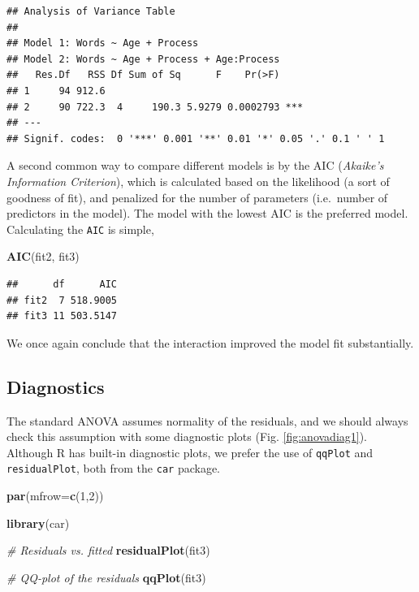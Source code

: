 \documentclass[]{book}
\newenvironment{Shaded}{\begin{snugshade}}{\end{snugshade}}
\newcommand{\CommentTok}[1]{\textcolor[rgb]{0.56,0.35,0.01}{\textit{#1}}}
\newcommand{\DataTypeTok}[1]{\textcolor[rgb]{0.13,0.29,0.53}{#1}}
\newcommand{\DecValTok}[1]{\textcolor[rgb]{0.00,0.00,0.81}{#1}}
\newcommand{\KeywordTok}[1]{\textcolor[rgb]{0.13,0.29,0.53}{\textbf{#1}}}
\newcommand{\NormalTok}[1]{#1}
\begin{document}
\begin{verbatim}
## Analysis of Variance Table
## 
## Model 1: Words ~ Age + Process
## Model 2: Words ~ Age + Process + Age:Process
##   Res.Df   RSS Df Sum of Sq      F    Pr(>F)    
## 1     94 912.6                                  
## 2     90 722.3  4     190.3 5.9279 0.0002793 ***
## ---
## Signif. codes:  0 '***' 0.001 '**' 0.01 '*' 0.05 '.' 0.1 ' ' 1
\end{verbatim}

A second common way to compare different models is by the AIC (\emph{Akaike's Information Criterion}), which is calculated based on the likelihood (a sort of goodness of fit), and penalized for the number of parameters (i.e.~number of predictors in the model). The model with the lowest AIC is the preferred model. Calculating the \texttt{AIC} is simple,

\begin{Shaded}
\begin{Highlighting}[]
\KeywordTok{AIC}\NormalTok{(fit2, fit3)}
\end{Highlighting}
\end{Shaded}

\begin{verbatim}
##      df      AIC
## fit2  7 518.9005
## fit3 11 503.5147
\end{verbatim}

We once again conclude that the interaction improved the model fit substantially.

\hypertarget{diagnostics}{%
\subsection{Diagnostics}\label{diagnostics}}

The standard ANOVA assumes normality of the residuals, and we should always check this assumption with some diagnostic plots (Fig. \ref{fig:anovadiag1}). Although R has built-in diagnostic plots, we prefer the use of \texttt{qqPlot} and \texttt{residualPlot}, both from the \texttt{car} package.

\begin{Shaded}
\begin{Highlighting}[]
\KeywordTok{par}\NormalTok{(}\DataTypeTok{mfrow=}\KeywordTok{c}\NormalTok{(}\DecValTok{1}\NormalTok{,}\DecValTok{2}\NormalTok{))}

\KeywordTok{library}\NormalTok{(car)}

\CommentTok{# Residuals vs. fitted}
\KeywordTok{residualPlot}\NormalTok{(fit3)}

\CommentTok{# QQ-plot of the residuals}
\KeywordTok{qqPlot}\NormalTok{(fit3)}
\end{Highlighting}
\end{Shaded}
\end{document}

